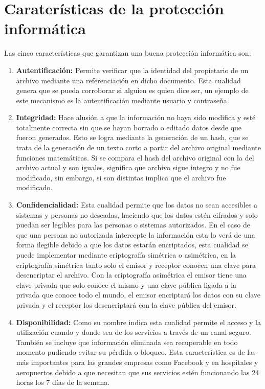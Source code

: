 \section{Caraterísticas de la protección informática}
Las cinco características que garantizan una buena protección informática son:
\begin{enumerate}
\item {\bfseries Autentificación:}
Permite verificar que la identidad del propietario de un archivo mediante una referenciación en dicho documento. Esta cualidad genera que se pueda corroborar si alguien es quien dice ser, un ejemplo de este mecanismo es la autentificación mediante usuario y contraseña.
\item {\bfseries Integridad:}
Hace alusión a que la información no haya sido modifica y esté totalmente correcta sin que se hayan borrado o editado datos desde que fueron generados. Esto se logra mediante la generación de un hash, que se trata de la generación de un texto corto a partir del archivo original mediante funciones matemáticas. Si se compara el hash del archivo original con la del archivo actual y son iguales, significa que archivo sigue integro y no fue modificado, sin embargo, si son distintas implica que el archivo fue modificado.
\item {\bfseries Confidencialidad:}
Esta cualidad permite que los datos no sean accesibles a sistemas y personas no deseadas, haciendo que los datos estén cifrados y solo puedan ser legibles para las personas o sistemas autorizados. En el caso de que una persona no autorizada intercepte la información esta lo verá de una forma ilegible debido a que los datos estarán encriptados, esta cualidad se puede implementar mediante criptografía simétrica o asimétrica, en la criptografía simétrica tanto solo el emisor y receptor conocen una clave para desencriptar el archivo. Con la criptografía asimétrica el emisor tiene una clave privada que solo conoce el mismo y una clave pública ligada a la privada que conoce todo el mundo, el emisor encriptará los datos con su clave privada y el receptor los desencriptará con la clave pública del emisor.
\item {\bfseries Disponibilidad:}
Como su nombre indica esta cualidad permite el acceso y la utilización cuando y donde sea de los servicios a través de un canal seguro. También se incluye que información eliminada sea recuperable en todo momento pudiendo evitar su pérdida o bloqueo. Esta característica es de las más importantes para las grandes empresas como Facebook y en hospitales y aeropuertos debido a que necesitan que sus servicios estén funcionando las 24 horas los 7 días de la semana.

\end{enumerate}

